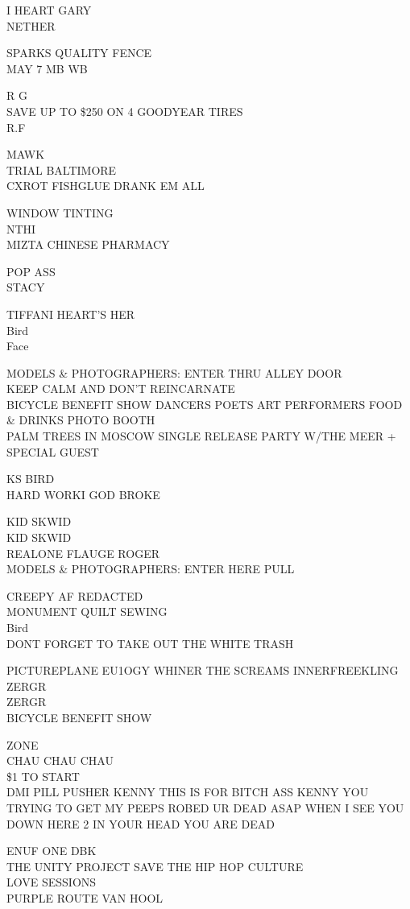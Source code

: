 \documentclass[10pt,letterpaper]{article}
\begin{document}
I HEART GARY\\
NETHER

SPARKS QUALITY FENCE\\
MAY 7 MB WB

R G\\
SAVE UP TO \$250 ON 4 GOODYEAR TIRES\\
R.F

MAWK\\
TRIAL BALTIMORE\\
CXROT FISHGLUE DRANK EM ALL

WINDOW TINTING\\
NTHI\\
MIZTA CHINESE PHARMACY

POP ASS\\
STACY

TIFFANI HEART'S HER\\
Bird\\
Face

MODELS \& PHOTOGRAPHERS: ENTER THRU ALLEY DOOR\\
KEEP CALM AND DON'T REINCARNATE\\
BICYCLE BENEFIT SHOW DANCERS POETS ART PERFORMERS FOOD \& DRINKS PHOTO BOOTH\\
PALM TREES IN MOSCOW SINGLE RELEASE PARTY W/THE MEER + SPECIAL GUEST

KS BIRD\\
HARD WORKI GOD BROKE

KID SKWID\\
KID SKWID\\
REALONE FLAUGE ROGER\\
MODELS \& PHOTOGRAPHERS: ENTER HERE PULL

CREEPY AF REDACTED\\
MONUMENT QUILT SEWING\\
Bird\\
DONT FORGET TO TAKE OUT THE WHITE TRASH

PICTUREPLANE EU1OGY WHINER THE SCREAMS INNERFREEKLING\\
ZERGR\\
ZERGR\\
BICYCLE BENEFIT SHOW

ZONE\\
CHAU CHAU CHAU\\
\$1 TO START\\
DMI PILL PUSHER KENNY THIS IS FOR BITCH ASS KENNY YOU TRYING TO GET MY PEEPS ROBED UR DEAD ASAP WHEN I SEE YOU DOWN HERE 2 IN YOUR HEAD YOU ARE DEAD

ENUF ONE DBK\\
THE UNITY PROJECT SAVE THE HIP HOP CULTURE\\
LOVE SESSIONS\\
PURPLE ROUTE VAN HOOL
\end{document}

